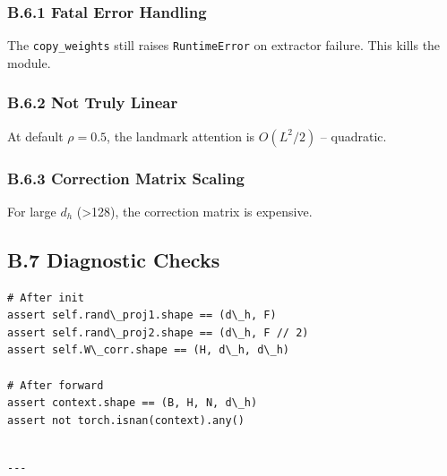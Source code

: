 \subsubsection{B.6.1 Fatal Error Handling}

The \texttt{copy\_weights} still raises \texttt{RuntimeError} on extractor failure. This 
kills the module.

\subsubsection{B.6.2 Not Truly Linear}

At default $\rho = 0.5$, the landmark attention is $O(L^2/2)$ -- 
quadratic.

\subsubsection{B.6.3 Correction Matrix Scaling}

For large $d_h$ (\textgreater{}128), the correction matrix is expensive.

\subsection{B.7 Diagnostic Checks}

\begin{lstlisting}
# After init
assert self.rand\_proj1.shape == (d\_h, F)
assert self.rand\_proj2.shape == (d\_h, F // 2)
assert self.W\_corr.shape == (H, d\_h, d\_h)

# After forward
assert context.shape == (B, H, N, d\_h)
assert not torch.isnan(context).any()
\end{lstlisting}
\begin{lstlisting}

---
\end{lstlisting}
